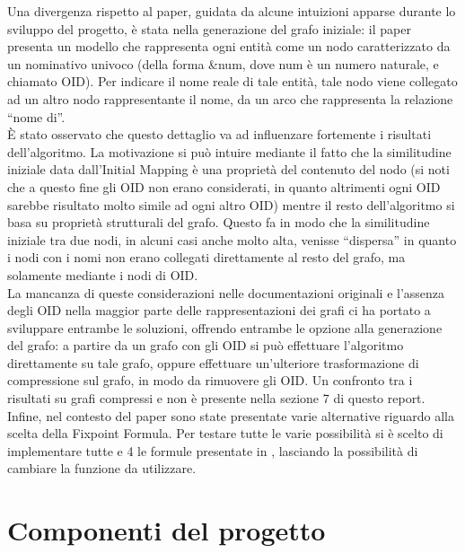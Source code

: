 \documentclass{article}
\begin{document}
Una divergenza rispetto al paper, guidata da alcune intuizioni apparse durante lo sviluppo del progetto, è stata nella generazione del grafo iniziale: il paper presenta un modello che rappresenta ogni entità come un nodo caratterizzato da un nominativo univoco (della forma \&num, dove num è un numero naturale, e chiamato OID). Per indicare il nome reale di tale entità, tale nodo viene collegato ad un altro nodo rappresentante il nome, da un arco che rappresenta la relazione “nome di”. \\

È stato osservato che questo dettaglio va ad influenzare fortemente i risultati dell’algoritmo. La motivazione si può intuire mediante il fatto che la similitudine iniziale data dall’Initial Mapping è una proprietà del contenuto del nodo (si noti che a questo fine gli OID non erano considerati, in quanto altrimenti ogni OID sarebbe risultato molto simile ad ogni altro OID) mentre il resto dell’algoritmo si basa su proprietà strutturali del grafo. Questo fa in modo che la similitudine iniziale tra due nodi, in alcuni casi anche molto alta, venisse “dispersa” in quanto i nodi con i nomi non erano collegati direttamente al resto del grafo, ma solamente mediante i nodi di OID.\\

La mancanza di queste considerazioni nelle documentazioni originali e l'assenza degli OID nella maggior parte delle rappresentazioni dei grafi ci ha portato a sviluppare entrambe le soluzioni, offrendo entrambe le opzione alla generazione del grafo: a partire da un grafo con gli OID si può effettuare l’algoritmo direttamente su tale grafo, oppure effettuare un’ulteriore trasformazione di compressione sul grafo, in modo da rimuovere gli OID. Un confronto tra i risultati su grafi compressi e non è presente nella sezione 7 di questo report.\\

Infine, nel contesto del paper sono state presentate varie alternative riguardo alla scelta della Fixpoint Formula. Per testare tutte le varie possibilità si è scelto di implementare tutte e 4 le formule presentate in \citep{sfpaper_ext}, lasciando la possibilità di cambiare la funzione da utilizzare.



\section{Componenti del progetto}
\end{document}
